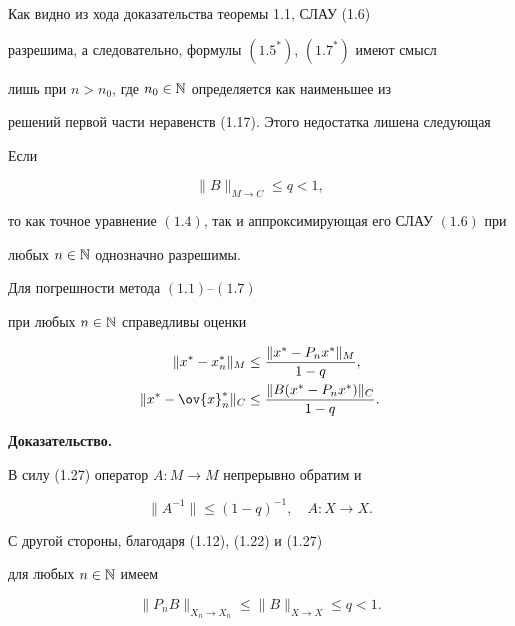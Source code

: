 Как видно из хода доказательства теоремы 1.1, СЛАУ (1.6)


разрешима, а следовательно, формулы $(1.5^*)$, $(1.7^*)$ имеют смысл


лишь при $n>n_0$, где $n_0\in \Bbb N$ определяется как наименьшее из


решений первой части неравенств (1.17). Этого недостатка лишена следующая





\begin{thms}


Если


\begin{equation}


\|B\|_{M\rightarrow C}\leq q<1,


\end{equation}


то как точное уравнение $(1.4)$, так и аппроксимирующая его СЛАУ $(1.6)$ при


любых $n\in \Bbb N$ однозначно разрешимы. 


Для погрешности метода $(1.1)$--$(1.7)$


при любых $n\in \Bbb N$ справедливы оценки


\begin{align}


\|x^*-x_n^*\|_M&\leq \frac{\|x^*-P_nx^*\|_M}{1-q}, \\


%


\|x^*-\ov{x}_n^*\|_C&\leq \frac{\|B(x^*-P_nx^*)\|_C}{1-q} .


\end{align}


\end{thms}





{\bf Доказательство.}


В силу (1.27) оператор $A:M\rightarrow M$ непрерывно обратим и


\begin{equation}


\|A^{-1}\|\leq (1-q)^{-1},\quad A:X\rightarrow X.


\end{equation}


С другой стороны, благодаря (1.12), (1.22) и (1.27)


для любых $n\in \Bbb N$ имеем


\begin{equation}


\|P_nB\|_{X_n\rightarrow X_n}\leq \|B\|_{X\rightarrow X}\leq q<1.


\end{equation}



